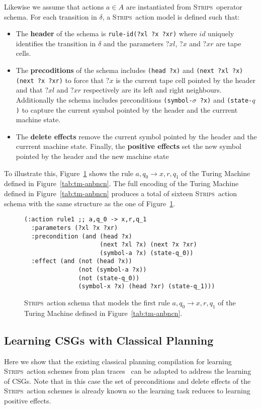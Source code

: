 \documentclass[letterpaper]{article} %
\newcommand{\strips}{\textsc{Strips}}     %
\begin{document}
Likewise we assume that actions $a\in A$ are instantiated from \strips\ operator schema. For each transition in $\delta$, a \strips\ action model is defined such that:
\begin{itemize}
\item The {\bf header} of the schema is {\tt rule-id(?xl ?x ?xr)} where $id$ uniquely identifies the transition in $\delta$ and the parameters $?xl$, $?x$ and $?xr$ are tape cells.
\item The {\bf precoditions} of the schema includes {\tt(head ?x)} and {\tt (next ?xl ?x) (next ?x ?xr)} to force that $?x$ is the current tape cell pointed by the header and that $?xl$ and $?xr$ respectively are its left and right neighbours. Additionally the schema includes preconditions {\tt(symbol-$\sigma$ ?x)} and {\tt (state-$q$)} to capture the current symbol pointed by the header and the currrent machine state.
\item The {\bf delete effects} remove the current symbol pointed by the header and the currrent machine state. Finally, the {\bf positive effects} set the new symbol pointed by the header and the new machine state 
\end{itemize}

To illustrate this, Figure~\ref{fig:update-rule} shows the rule $a,q_0\rightarrow x,r,q_1$ of the Turing Machine defined in Figure~\ref{tab:tm-anbncn}. The full encoding of the Turing Machine defined in Figure~\ref{tab:tm-anbncn} produces a total of sixteen \strips\ action schema with the same structure as the one of Figure~\ref{fig:update-rule}. 
\begin{figure}[hbt!]
\begin{scriptsize}
\begin{verbatim}
(:action rule1 ;; a,q_0 -> x,r,q_1
  :parameters (?xl ?x ?xr)
  :precondition (and (head ?x) 
                     (next ?xl ?x) (next ?x ?xr) 
                     (symbol-a ?x) (state-q_0))
  :effect (and (not (head ?x)) 
               (not (symbol-a ?x)) 
               (not (state-q_0))
               (symbol-x ?x) (head ?xr) (state-q_1)))
\end{verbatim}
\end{scriptsize}
 \caption{\small \strips\ action schema that models the first rule $a,q_0\rightarrow x,r,q_1$ of the Turing Machine defined in Figure~\ref{tab:tm-anbncn}.}
\label{fig:update-rule}
\end{figure}


\subsection{Learning CSGs with Classical Planning}
Here we show that the existing classical planning compilation for learning \strips\ action schemes from plan traces~\cite{aineto:learningSTRIPS:ICAPS2018} can be adapted to address the learning of CSGs. Note that in this case the set of preconditions and delete effects of the \strips\ action schemes is already known so the learning task reduces to learning positive effects.
\end{document}
